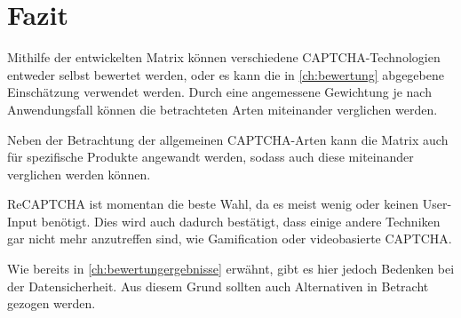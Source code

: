 \chapter{Fazit}

Mithilfe der entwickelten Matrix können verschiedene CAPTCHA-Technologien entweder selbst bewertet werden,
oder es kann die in \autoref{ch:bewertung} abgegebene Einschätzung verwendet werden.
Durch eine angemessene Gewichtung je nach Anwendungsfall können die betrachteten Arten miteinander verglichen werden.

Neben der Betrachtung der allgemeinen CAPTCHA-Arten kann die Matrix auch für spezifische Produkte angewandt werden,
sodass auch diese miteinander verglichen werden können.

ReCAPTCHA ist momentan die beste Wahl, da es meist wenig oder keinen User-Input benötigt.
Dies wird auch dadurch bestätigt, dass einige andere Techniken gar nicht mehr anzutreffen sind,
wie Gamification oder videobasierte CAPTCHA. 

Wie bereits in \autoref{ch:bewertungergebnisse} erwähnt, gibt es hier jedoch Bedenken bei der Datensicherheit.
Aus diesem Grund sollten auch Alternativen in Betracht gezogen werden. 


